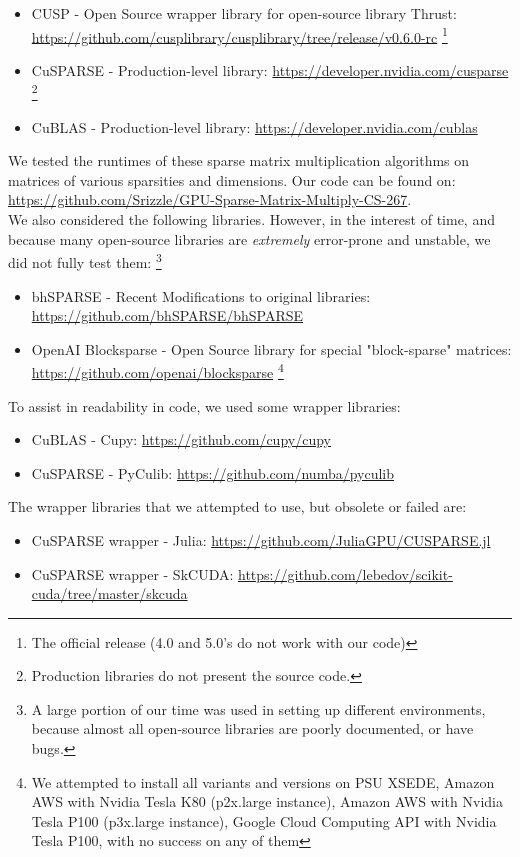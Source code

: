 \documentclass[12pt]{article}
\begin{document}
\begin{itemize}
\item CUSP - Open Source wrapper library for open-source library Thrust: \url{https://github.com/cusplibrary/cusplibrary/tree/release/v0.6.0-rc} \footnote{The official release (4.0 and 5.0's do not work with our code) }
\item CuSPARSE - Production-level library: \url{https://developer.nvidia.com/cusparse} \footnote{Production libraries do not present the source code.}
\item CuBLAS - Production-level library: \url{https://developer.nvidia.com/cublas}
\end{itemize}
\hspace{0.5cm}We tested the runtimes of these sparse matrix multiplication algorithms on matrices of various sparsities and dimensions. Our code can be found on: \url{https://github.com/Srizzle/GPU-Sparse-Matrix-Multiply-CS-267}.\\ We also considered the following libraries. However, in the interest of time, and because many open-source libraries are \textit{extremely} error-prone and unstable, we did not fully test them: \footnote{A large portion of our time was used in setting up different environments, because almost all open-source libraries are poorly documented, or have bugs.}
\begin{itemize}
\item bhSPARSE - Recent Modifications to original libraries: \url{https://github.com/bhSPARSE/bhSPARSE}
\item OpenAI Blocksparse - Open Source library for special "block-sparse" matrices: \url{https://github.com/openai/blocksparse} \footnote{We attempted to install all variants and versions on PSU XSEDE, Amazon AWS with Nvidia Tesla K80 (p2x.large instance), Amazon AWS with Nvidia Tesla P100 (p3x.large instance), Google Cloud Computing API with Nvidia Tesla P100, with no success on any of them}
\end{itemize}

To assist in readability in code, we used some wrapper libraries:
\begin{itemize}
\item CuBLAS - Cupy: \url{https://github.com/cupy/cupy}
\item CuSPARSE - PyCulib: \url{https://github.com/numba/pyculib}
\end{itemize}

The wrapper libraries that we attempted to use, but obsolete or failed are:
\begin{itemize}
\item CuSPARSE wrapper - Julia: \url{https://github.com/JuliaGPU/CUSPARSE.jl}
\item CuSPARSE wrapper - SkCUDA: \url{https://github.com/lebedov/scikit-cuda/tree/master/skcuda}
\end{itemize}
\end{document}
